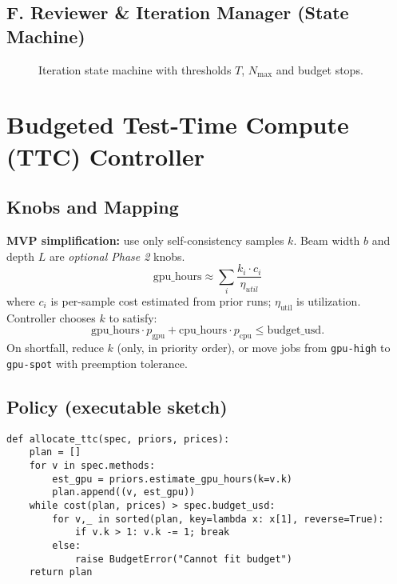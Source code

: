 \subsection{F. Reviewer \& Iteration Manager (State Machine)}
\begin{figure}[h]
\centering
{}
\caption{Iteration state machine with thresholds \(T\), \(N_{\max}\) and budget stops.}
\end{figure}

\section{Budgeted Test-Time Compute (TTC) Controller}
\subsection{Knobs and Mapping}
\textbf{MVP simplification:} use only self-consistency samples \(k\). Beam width \(b\) and depth \(L\) are \textit{optional Phase 2} knobs.
\[\mathrm{gpu\_hours} \approx \sum_{i} \frac{k_i \cdot c_i}{\eta_{util}}\]
where \(c_i\) is per-sample cost estimated from prior runs; \(\eta_{\text{util}}\) is utilization. Controller chooses \(k\) to satisfy:
\[
\text{gpu\_hours} \cdot p_{\text{gpu}} + \text{cpu\_hours} \cdot p_{\text{cpu}} \le \text{budget\_usd}.
\]
On shortfall, reduce \(k\) (only, in priority order), or move jobs from \texttt{gpu-high} to \texttt{gpu-spot} with preemption tolerance.

\subsection{Policy (executable sketch)}
\begin{lstlisting}[style=code,caption={Budget controller pseudocode (MVP k-only)}]
def allocate_ttc(spec, priors, prices):
    plan = []
    for v in spec.methods:
        est_gpu = priors.estimate_gpu_hours(k=v.k)
        plan.append((v, est_gpu))
    while cost(plan, prices) > spec.budget_usd:
        for v,_ in sorted(plan, key=lambda x: x[1], reverse=True):
            if v.k > 1: v.k -= 1; break
        else:
            raise BudgetError("Cannot fit budget")
    return plan
\end{lstlisting}

